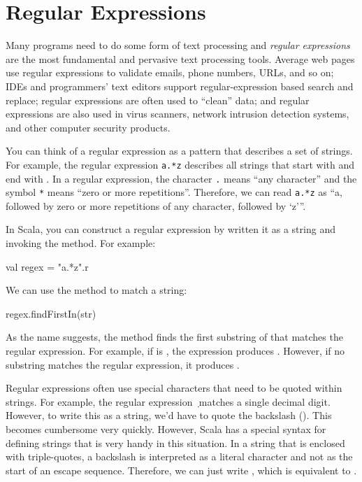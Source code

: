\section{Regular Expressions}

Many programs need to do some form of text processing and \emph{regular expressions} are the most fundamental and pervasive text processing tools. Average web pages use regular expressions to validate emails, phone numbers, URLs, and so on; IDEs and programmers' text editors support regular-expression based search and replace; regular expressions are often used to ``clean'' data; and regular expressions are also used in virus scanners, network intrusion detection systems, and other computer security products.

You can think of a regular expression as a pattern that describes a set of strings. For example, the regular expression \texttt{a.*z} describes all strings that start with  and end with . In a regular expression, the character \texttt{.} means ``any character'' and the symbol \texttt{*} means ``zero or more repetitions''. Therefore, we can read \texttt{a.*z} as ``a, followed by zero or more repetitions of any character, followed by `z'''.

In Scala, you can construct a regular expression by written it as a string and invoking the  method. For example:
\begin{scalacode}
val regex = "a.*z".r
\end{scalacode}

We can use the  method to match a string:
\begin{scalacode}
regex.findFirstIn(str)
\end{scalacode}
As the name suggests, the method finds the first substring of  that matches the regular expression. For example, if  is , the expression produces . However, if no substring matches the regular expression, it produces .

\begin{notation}
Regular expressions often use special characters that need to be quoted within strings. For example, the regular expression \texttt{\d} matches a single decimal digit. However, to write this as a string, we'd have to quote the backslash (). This becomes cumbersome very quickly. However, Scala has a special syntax for defining strings that is very handy in this situation. In a  string that is enclosed with triple-quotes, a backslash is interpreted as a literal character and not as the start of an escape sequence. Therefore, we can just write , which is equivalent to .
\end{notation}

